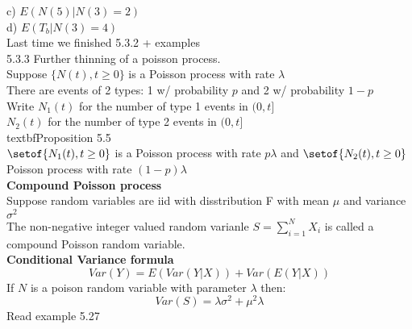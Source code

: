 \documentclass[answers,12pt,addpoints]{exam}
\begin{document}
c) $E(N(5) | N(3) = 2)$\\
d) $E(T_b | N(3) = 4)$\\
Last time we finished 5.3.2 + examples\\
5.3.3 Further thinning of a poisson process. \\
Suppose $\{N(t), t \geq 0\}$ is a Poisson process with rate $\lambda$\\
There are events of 2 types: 1 w/ probability $p$ and 2 w/ probability $1-p$\\
Write $N_1(t)$ for the number of type 1 events in $(0,t]$\\
$N_2(t)$ for the number of type 2 events in $(0,t]$\\
textbf{Proposition 5.5}\\
$\setof{N_1(t), t \geq 0}$ is a Poisson process with rate $p\lambda$ and $\setof{N_2(t), t \geq 0} $ Poisson process with rate $(1-p)\lambda$\\
\textbf{Compound Poisson process}\\
Suppose random variables are iid with disstribution F with mean $\mu$ and variance $\sigma^2$\\
The non-negative integer valued random varianle $S = \sum_{i=1}^{N} X_i$ is called a compound Poisson random variable.\\
\textbf{Conditional Variance formula}\\
$$Var(Y) = E(Var(Y|X)) + Var(E(Y|X))$$
If $N$ is a poison random variable with parameter $\lambda$ then:\\
$$Var(S) = \lambda \sigma^2 + \mu^2 \lambda$$
Read example 5.27
\end{document}
